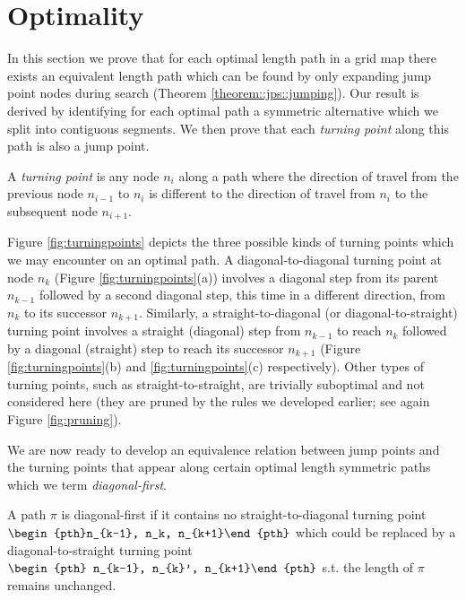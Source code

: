 \section{Optimality}
In this section we prove that for each optimal length path in a grid map there
exists an equivalent length path which can be found by only expanding jump
point nodes during search (Theorem \ref{theorem::jps::jumping}).  Our result is
derived by identifying for each optimal path a symmetric alternative which we
split into contiguous segments. We then prove that each \emph{turning point}
along this path is also a jump point.

\begin{definition}
\label{def::jps::turningpoint}
A \emph{turning point} is any node $n_{i}$ along a path where the direction of
travel from the previous node $n_{i-1}$ to $n_{i}$ is different to the direction
of travel from $n_{i}$ to the subsequent node $n_{i+1}$.
\end{definition}

Figure \ref{fig:turningpoints} depicts the three possible kinds of turning
points which we may encounter on an optimal path. A diagonal-to-diagonal turning
point at node $n_k$ (Figure \ref{fig:turningpoints}(a)) involves a diagonal step
from its parent $n_{k-1}$ followed by a second diagonal step, this time in a
different direction, from $n_{k}$ to its successor $n_{k+1}$.  Similarly, a
straight-to-diagonal (or diagonal-to-straight) turning point involves a straight
(diagonal) step from $n_{k-1}$ to reach $n_{k}$ followed by a diagonal
(straight) step to reach its successor $n_{k+1}$ (Figure
\ref{fig:turningpoints}(b) and \ref{fig:turningpoints}(c) respectively).  
Other types of turning points, such as straight-to-straight, are trivially
suboptimal and not considered here (they are pruned by the rules we developed
earlier; see again Figure \ref{fig:pruning}).

We are now ready to develop an equivalence relation between
jump points and the turning points that appear along certain optimal length 
symmetric paths which we term \emph{diagonal-first}.
 
\begin{definition}
A path $\pi$ is diagonal-first if it contains no straight-to-diagonal turning point
$\begin{pth}n_{k-1}, n_k, n_{k+1}\end{pth}$
which could be replaced by a diagonal-to-straight turning point $\begin{pth}
n_{k-1}, n_{k}', n_{k+1}\end{pth}$ s.t.
the length of $\pi$ remains unchanged.
\end{definition}

